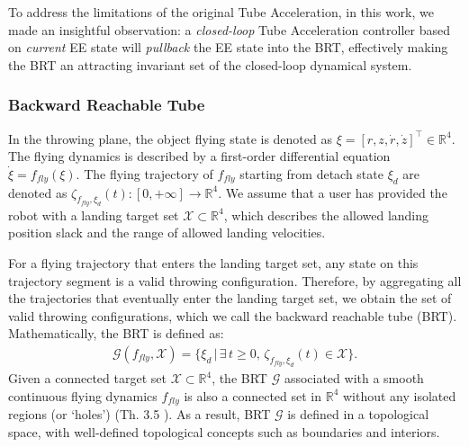 \documentclass[letterpaper, 10 pt, conference]{ieeeconf} %
\begin{document}
To address the limitations of the original Tube Acceleration, in this work, we made an insightful observation: a \emph{closed-loop} Tube Acceleration controller based on \emph{current} EE state will \emph{pullback} the EE state into the BRT, effectively making the BRT an attracting invariant set of the closed-loop dynamical system.

\subsubsection{Backward Reachable Tube}\label{subsec:BRT}
In the throwing plane, the object flying state is denoted as $\xi = [r, z, \dot{r}, \dot{z}]^\top \in \mathbb{R}^4$. The flying dynamics is described by a first-order differential equation $\dot{\xi} = f_{fly}(\xi)$. The flying trajectory of $f_{fly}$ starting from detach state $\xi_{d}$ are denoted as $\zeta_{f_{fly}, \xi_{d}}(t):[0, +\infty] \rightarrow \mathbb{R}^4$. We assume that a user has provided the robot with a landing target set $\mathcal{X} \subset \mathbb{R}^4$, which describes the allowed landing position slack and the range of allowed landing velocities.

For a flying trajectory that enters the landing target set, any state on this trajectory segment is a valid throwing configuration. Therefore, by aggregating all the trajectories that eventually enter the landing target set, we obtain the set of valid throwing configurations, which we call the backward reachable tube (BRT). Mathematically, the BRT is defined as:
\begin{align*}
    \mathcal{G}(f_{fly}, \mathcal{X}) = \{\xi_{d} \, | \, \exists \, t \geq 0, \, \zeta_{f_{fly}, \xi_d}(t) \in \mathcal{X}\}.
\end{align*}
Given a connected target set $\mathcal{X} \subset \mathbb{R}^4$, the BRT $\mathcal{G}$ associated with a smooth continuous flying dynamics $f_{fly}$ is also a connected set in $\mathbb{R}^4$ without any isolated regions (or `holes') (Th. 3.5 \cite{khalil2002nonlinear}). 
As a result, BRT $\mathcal{G}$ is defined in a topological space, with well-defined topological concepts such as boundaries and interiors. 
\end{document}
